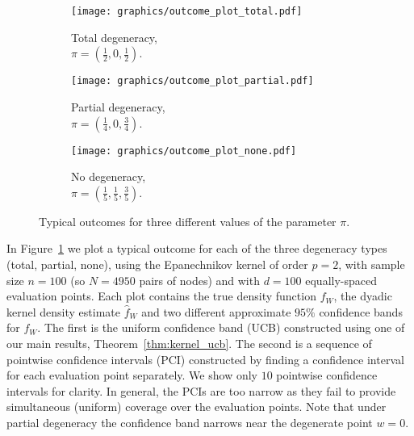 \documentclass[11pt,lof]{puthesis}
\theoremstyle{break}
\theoremstyle{proof}
\begin{document}
\begin{figure}[b!]
  \centering
  \begin{subfigure}{0.32\textwidth}
    \centering
    \texttt{[image: graphics/outcome\_plot\_total.pdf]}
    \caption{Total degeneracy, \\
    $\pi = \left( \frac{1}{2}, 0, \frac{1}{2} \right)$.}
  \end{subfigure}
  \begin{subfigure}{0.32\textwidth}
    \centering
    \texttt{[image: graphics/outcome\_plot\_partial.pdf]}
    \caption{Partial degeneracy, \\
    $\pi = \left( \frac{1}{4}, 0, \frac{3}{4} \right)$.}
  \end{subfigure}
  \begin{subfigure}{0.32\textwidth}
    \centering
    \texttt{[image: graphics/outcome\_plot\_none.pdf]}
    \caption{No degeneracy, \\
    $\pi = \left( \frac{1}{5}, \frac{1}{5}, \frac{3}{5} \right)$.}
  \end{subfigure}
  \caption[Typical outcomes for different values of the parameter $\pi$]
  {Typical outcomes for three different values of the parameter $\pi$.}
  \label{fig:kernel_results}
\end{figure}

In Figure~\ref{fig:kernel_results} we plot a typical outcome for each of the
three
degeneracy types (total, partial, none), using the Epanechnikov kernel of order
$p=2$, with sample size $n=100$ (so $N=4950$ pairs of nodes) and with $d=100$
equally-spaced evaluation points. Each plot contains the true density function
$f_W$, the dyadic kernel density estimate $\hat f_W$ and two different
approximate $95\%$ confidence bands for $f_W$. The first is the uniform
confidence band (UCB) constructed using one of our main results,
Theorem~\ref{thm:kernel_ucb}. The second is a sequence of pointwise confidence
intervals (PCI) constructed by finding a confidence interval for each
evaluation point separately. We show only $10$ pointwise confidence intervals
for clarity. In general, the PCIs are too narrow as they fail to provide
simultaneous (uniform) coverage over the evaluation points. Note that under
partial degeneracy the confidence band narrows near the degenerate point
$w = 0$.
\end{document}
